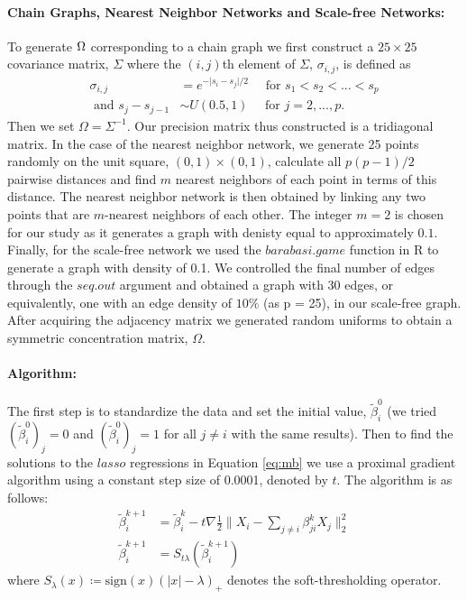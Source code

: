 \documentclass[12pt, leqno]{article}
\providecommand{\abs}[1]{\lvert#1\rvert}
\providecommand{\norm}[1]{\lVert#1\rVert}
\def\om{\ensuremath\Omega}
\newcommand{\sign}{\mathrm{sign}}
\begin{document}
\paragraph{Chain Graphs, Nearest Neighbor Networks and Scale-free
  Networks:} 
To generate $\om$ corresponding to a chain graph we first construct a
$25 \times 25$  covariance matrix, $\Sigma$ where the $(i,j)$th
element of $\Sigma$, $\sigma_{i,j}$, is defined as 
\begin{align*}
\sigma_{i,j} &= e^{-\abs{s_i -
s_j}/2} \quad \text{ for } s_1 < s_2 < ... < s_p \\
\text{ and } s_j - s_{j-1} &\sim
U(0.5,1) \quad \text{ for } j = 2, ..., p.
\end{align*} 
Then we set $\Omega = \Sigma^{-1}$. Our
precision matrix thus constructed is a tridiagonal matrix. In the case
of the nearest neighbor network, we generate 25 points randomly on the
unit square, $(0,1) \times (0,1)$, calculate all $p(p-1)/2$ pairwise
distances and find $m$ nearest neighbors of each point in terms of
this distance. The nearest neighbor network is then obtained by linking any
two points that are $m$-nearest neighbors of each other. The integer
$m = 2$ is chosen for our study as it generates a graph with denisty
equal to approximately $0.1$. Finally, for the scale-free network
we used the $barabasi.game$ function in
R to generate a graph with density of 0.1. We
controlled the final number of edges through
the $seq.out$ argument and obtained a graph with 30 edges, or equivalently, one with an edge
density of $10\%$ (as p = 25), in our scale-free
graph.  
After acquiring the adjacency matrix we generated random uniforms to
obtain a symmetric concentration matrix, $\Omega$. 

\paragraph{Algorithm:} The first step is to standardize the data and
set the initial value, $\tilde{\beta}_i^{0}$ (we tried
$(\tilde{\beta}_i^{0})_j = 0$ and $(\tilde{\beta}_i^{0})_j = 1$ for
all $j \not= i$ with the
same results). Then
to find the solutions to the $lasso$ regressions in Equation \ref{eq:mb} we 
use a proximal gradient algorithm using a constant step size of
0.0001,
denoted by $t$. The algorithm is as follows:
\begin{align*}
        \tilde{\beta}_i^{k+1} &= \tilde{\beta}_i^{k} - t \nabla \frac{1}{2}\norm{X_i -
  \sum_{j \not= i} \beta_{ji}^{k}  X_j}_2^2 \\
        \tilde{\beta}_i^{k+1} &= S_{t \lambda} (\tilde{\beta}_i^{k+1})
\end{align*}
where $S_{\lambda}(x) \coloneqq \sign(x)(\abs{x}-\lambda)_{+}$ denotes the soft-thresholding operator.
\end{document}
